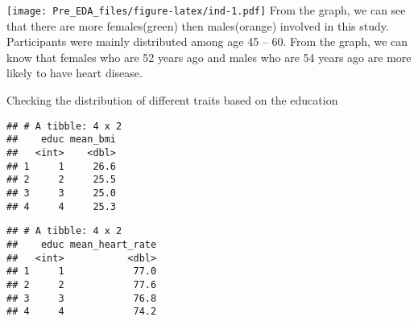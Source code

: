 \documentclass[]{article}
\newenvironment{Shaded}{\begin{snugshade}}{\end{snugshade}}
\newcommand{\KeywordTok}[1]{\textcolor[rgb]{0.13,0.29,0.53}{\textbf{#1}}}
\newcommand{\DataTypeTok}[1]{\textcolor[rgb]{0.13,0.29,0.53}{#1}}
\newcommand{\StringTok}[1]{\textcolor[rgb]{0.31,0.60,0.02}{#1}}
\newcommand{\OperatorTok}[1]{\textcolor[rgb]{0.81,0.36,0.00}{\textbf{#1}}}
\newcommand{\NormalTok}[1]{#1}
\begin{document}
\texttt{[image: Pre\_EDA\_files/figure-latex/ind-1.pdf]} From the graph,
we can see that there are more females(green) then males(orange)
involved in this study. Participants were mainly distributed among age
45 -- 60. From the graph, we can know that females who are 52 years ago
and males who are 54 years ago are more likely to have heart disease.

Checking the distribution of different traits based on the education

\begin{Shaded}
\end{Shaded}

\begin{verbatim}
## # A tibble: 4 x 2
##    educ mean_bmi
##   <int>    <dbl>
## 1     1     26.6
## 2     2     25.5
## 3     3     25.0
## 4     4     25.3
\end{verbatim}

\begin{Shaded}
\end{Shaded}

\begin{verbatim}
## # A tibble: 4 x 2
##    educ mean_heart_rate
##   <int>           <dbl>
## 1     1            77.0
## 2     2            77.6
## 3     3            76.8
## 4     4            74.2
\end{verbatim}

\begin{Shaded}
\end{Shaded}
\end{document}
